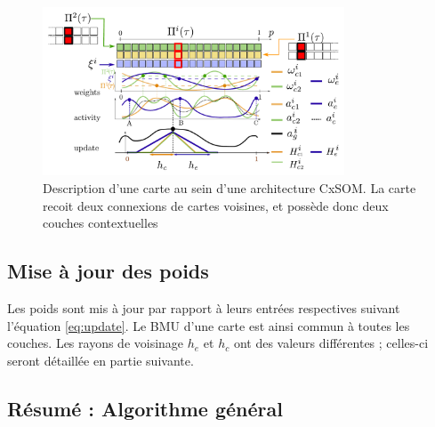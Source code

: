\begin{figure}
\centering
\includegraphics[width=0.8\textwidth]{one_map.pdf}
\caption{Description d'une carte au sein d'une architecture CxSOM. La carte recoit deux connexions de cartes voisines, et possède donc deux couches contextuelles}
\label{fig:one_map}
\end{figure}

\subsection{Mise à jour des poids}

Les poids sont mis à jour par rapport à leurs entrées respectives suivant l'équation \ref{eq:update}. Le BMU d'une carte est ainsi commun à toutes les couches. Les rayons de voisinage $h_e$ et $h_c$ ont des valeurs différentes ; celles-ci seront détaillée en partie suivante. 

\subsection{Résumé : Algorithme général}





